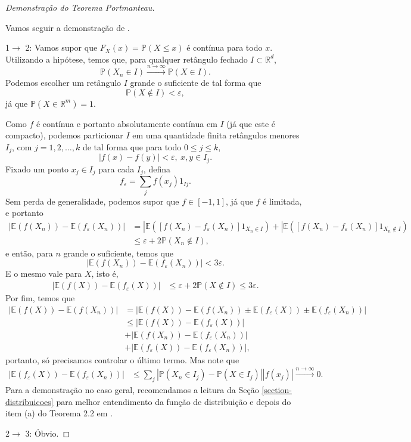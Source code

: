 \documentclass[12pt,a4paper,oneside]{book}
\theoremstyle{definition}
\theoremstyle{remark}
\numberwithin{equation}{section}
\newcommand{\R}{\mathbb{R}}
\newcommand{\e}{\varepsilon}
\newcommand{\E}{\mathbb{E}}
\newcommand{\pr}{\mathbb{P}}
\newcommand{\rarrowlimn}{\xrightarrow{n\rightarrow \infty}}
\begin{document}
\begin{proof}[Demonstração do Teorema Portmanteau]
$ $

Vamos seguir a demonstração de \cite{vaart-stat}.

\textrm{1$\rightarrow$ 2:}
Vamos supor que $F_X(x)= \pr(X\leq x)$ é  contínua para todo $x$.
Utilizando a hipótese, temos que, para qualquer retângulo fechado $I\subset \R^d$,
$$\pr(X_n\in I) \rarrowlimn \pr(X\in I). $$
Podemos escolher um retângulo $I$ grande o suficiente de tal forma que
$$\pr(X\not\in I)< \e, $$
já que $\pr(X\in \R^m) = 1$.

Como $f$ é contínua e portanto absolutamente contínua em $I$ (já que este é compacto), podemos particionar $I$ em uma quantidade finita retângulos menores $I_j$, com $j=1,2,\dots,k$ de tal forma que para todo $0\leq j\leq k$,
$$|f(x)-f(y)|< \e,\ x,y\in I_j .$$
Fixado um ponto $x_j\in I_j$ para cada $I_j$, defina 
$$f_\e = \sum_j f(x_j)1_{Ij}. $$ 
Sem perda de generalidade, podemos supor que $f\in [-1,1]$, já que $f$ é limitada, e portanto
\begin{align*}
|\E(f(X_n))-\E(f_\e(X_n))  | & = |\E([f(X_n)-f_\e(X_n)]1_{X_n\in I})+|\E([f(X_n)-f_\e(X_n)]1_{X_n\not\in I}) \\
& \leq \e + 2\pr(X_n\not\in I),
\end{align*}
e então, para $n$ grande o suficiente, temos que 
$$|\E(f(X_n))-\E(f_\e(X_n))  |< 3\e. $$
E o mesmo vale para $X$, isto é,
\begin{align*}
|\E(f(X))-\E(f_\e(X))  | & \leq \e + 2\pr(X\not\in I) \leq 3\e.
\end{align*}
Por fim, temos que
\begin{align*}
|\E(f(X))-\E(f(X_n))| & = |\E(f(X))-\E(f(X_n)) \pm \E(f_\e(X)) \pm\E(f_\e(X_n))|\\
&\leq |\E(f(X))-\E(f_\e(X))|&\\
& + |\E(f(X_n))-\E(f_\e(X_n))| \\
& + |\E(f_\e(X))-\E(f_\e(X_n))|, 
\end{align*}
portanto, só precisamos controlar o último termo. Mas note que
\begin{align*}
|\E(f_\e(X))-\E(f_\e(X_n))| &\leq \sum_j |\pr(X_n\in I_j)-\pr(X\in I_j)||f(x_j)| \rarrowlimn 0.
\end{align*} 
Para a demonstração  no caso geral, recomendamos a leitura da Seção \ref{section- distribuicoes} para melhor entendimento da função de distribuição e depois do item (a) do Teorema 2.2 em  \cite{vaart-stat}.

\textrm{2$\rightarrow$ 3:} Óbvio.


\end{proof}
\end{document}
